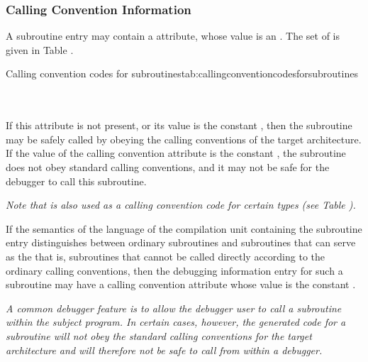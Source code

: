\subsubsection{Calling Convention Information}
\hypertarget{chap:DWATcallingconventionforsubprograms}{}
A subroutine entry may contain a
\DWATcallingconventionDEFN{}
attribute, whose value is an
. The set of
is given in Table .

\begin{simplenametable}[1.4in]{Calling convention codes for subroutines}{tab:callingconventioncodesforsubroutines}
\DWCCnormal        \\
\DWCCprogram       \\
\DWCCnocall        \\
\end{simplenametable}

If this attribute is not present, or its value is the constant
\DWCCnormalTARG, then the subroutine may be safely called by
obeying the  calling conventions of the target
architecture. If the value of the calling convention attribute
is the constant \DWCCnocallTARG, the subroutine does not obey
standard calling conventions, and it may not be safe for the
debugger to call this subroutine.

\textit{Note that \DWCCnormal{} is also used as a calling convention
code for certain types
(see Table ).}

If the semantics of the language of the compilation unit
containing the subroutine entry distinguishes between ordinary
subroutines and subroutines that can serve as the  that is, subroutines that cannot be called
directly according to the ordinary calling conventions,
then the debugging information entry for such a subroutine
may have a calling convention attribute whose value is the
constant \DWCCprogramTARG.

\textit{A common debugger feature is to allow the debugger user to call
a subroutine within the subject program. In certain cases,
however, the generated code for a subroutine will not obey
the standard calling conventions for the target architecture
and will therefore not be safe to call from within a debugger.}

